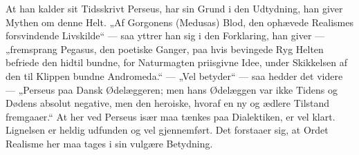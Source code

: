 \documentclass[12pt,a4paper]{book}
\newcommand{\apage}[1]{\marginnote{\footnotesize\textit{[#1]}}}
\begin{document}
At han kalder sit Tidsskrivt Perseus, har sin Grund i den Udtydning, han
giver Mythen om denne Helt. „Af Gorgonens (Medusas) Blod, den ophævede
Realismes forsvindende Livskilde“ --- saa yttrer han sig i den Forklaring,
han giver --- „fremsprang Pegasus, den poetiske Ganger, paa hvis bevingede
Ryg Helten befriede den hidtil bundne, for Naturmagten priisgivne Idee,
under Skikkelsen af den til Klippen bundne Andromeda.“ --- „Vel betyder“
--- saa hedder det videre --- „Perseus paa Dansk Ødelæggeren; men hans
Ødelæggen var ikke Tidens og Dødens absolut negative, men den heroiske,
hvoraf en ny og ædlere Tilstand fremgaaer.“ At her ved Perseus især maa
tænkes paa Dialektiken, er vel klart. Lignelsen er heldig udfunden og vel
\apage{3} gjennemført. Det forstaaer sig, at Ordet Realisme her maa tages i sin
vulgære Betydning.
\end{document}
